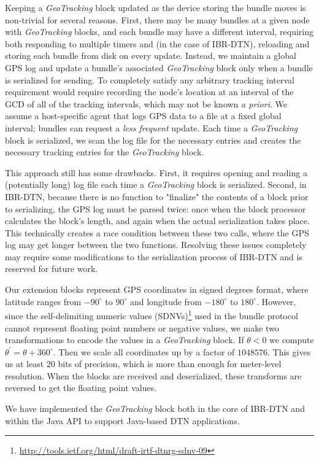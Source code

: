 Keeping a {\em GeoTracking} block updated as the device storing the bundle moves is non-trivial for several reasons. First, there may be many bundles at a given node with {\em GeoTracking} blocks, and each bundle may have a different interval, requiring both responding to multiple timers and (in the case of IBR-DTN), reloading and storing each bundle from disk on every update. Instead, we maintain a global GPS log and update a bundle's associated {\em GeoTracking} block only when a bundle is serialized for sending. 
To completely satisfy any arbitrary tracking interval requirement would require recording the node's location at an interval of the GCD of all of the tracking intervals, which may not be known {\em a priori}. We assume a host-specific agent that logs GPS data to a file at a fixed global interval; bundles can request a {\em less frequent} update. Each time a {\em GeoTracking} block is serialized, we scan the log file for the necessary entries and creates the necessary tracking entries for the {\em GeoTracking} block.

This approach still has some drawbacks.  First, it requires opening and reading a (potentially long) log file each time a {\em GeoTracking} block is serialized.  Second, in IBR-DTN, because there is no function to "finalize" the contents of a block prior to serializing, the GPS log must be parsed twice: once when the block processor calculates the block's length, and again when the actual serialization takes place.  
This technically creates a race condition between these two calls, where the GPS log may get longer between the two functions.  Resolving these issues completely may require some modifications to the serialization process of IBR-DTN and is reserved for future work.

Our extension blocks represent GPS coordinates in signed degrees format, where latitude ranges from $-90^{\circ}$ to $90^{\circ}$ and longitude from $-180^{\circ}$ to $180^{\circ}$.  However, since the self-delimiting numeric values (SDNVs)\footnote{\scriptsize\url{http://tools.ietf.org/html/draft-irtf-dtnrg-sdnv-09}} used in the bundle protocol cannot represent floating point numbers or negative values, we make two transformations to encode the values in a {\em GeoTracking} block.  If $\theta<0$ we compute $\theta^{\prime}=\theta+360^{\circ}$.  Then we scale all coordinates up by a factor of $1048576$.  This gives us at least 20 bits of precision, which is more than enough for meter-level resolution.  When the blocks are received and deserialized, these transforms are reversed to get the floating point values.

We have implemented the {\em GeoTracking} block both in the core of IBR-DTN and within the Java API to support Java-based DTN applications.



